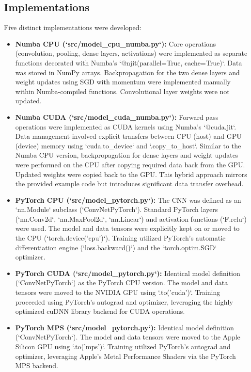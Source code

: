 \documentclass[conference]{IEEEtran} %
\begin{document}
\subsection{Implementations}
Five distinct implementations were developed:
\begin{itemize}
    \item \textbf{Numba CPU (`src/model_cpu_numba.py`):} Core operations (convolution, pooling, dense layers, activations) were implemented as separate functions decorated with Numba's `@njit(parallel=True, cache=True)`. Data was stored in NumPy arrays. Backpropagation for the two dense layers and weight updates using SGD with momentum were implemented manually within Numba-compiled functions. Convolutional layer weights were not updated.
    \item \textbf{Numba CUDA (`src/model_cuda_numba.py`):} Forward pass operations were implemented as CUDA kernels using Numba's `@cuda.jit`. Data management involved explicit transfers between CPU (host) and GPU (device) memory using `cuda.to_device` and `.copy_to_host`. Similar to the Numba CPU version, backpropagation for dense layers and weight updates were performed on the CPU after copying required data back from the GPU. Updated weights were copied back to the GPU. This hybrid approach mirrors the provided example code but introduces significant data transfer overhead.
    \item \textbf{PyTorch CPU (`src/model_pytorch.py`):} The CNN was defined as an `nn.Module` subclass (`ConvNetPyTorch`). Standard PyTorch layers (`nn.Conv2d`, `nn.MaxPool2d`, `nn.Linear`) and activation functions (`F.relu`) were used. The model and data tensors were explicitly kept on or moved to the CPU (`torch.device('cpu')`). Training utilized PyTorch's automatic differentiation engine (`loss.backward()`) and the `torch.optim.SGD` optimizer.
    \item \textbf{PyTorch CUDA (`src/model_pytorch.py`):} Identical model definition (`ConvNetPyTorch`) as the PyTorch CPU version. The model and data tensors were moved to the NVIDIA GPU using `.to('cuda')`. Training proceeded using PyTorch's autograd and optimizer, leveraging the highly optimized cuDNN library backend for CUDA operations.
    \item \textbf{PyTorch MPS (`src/model_pytorch.py`):} Identical model definition (`ConvNetPyTorch`). The model and data tensors were moved to the Apple Silicon GPU using `.to('mps')`. Training utilized PyTorch's autograd and optimizer, leveraging Apple's Metal Performance Shaders via the PyTorch MPS backend.
\end{itemize}
\end{document}
